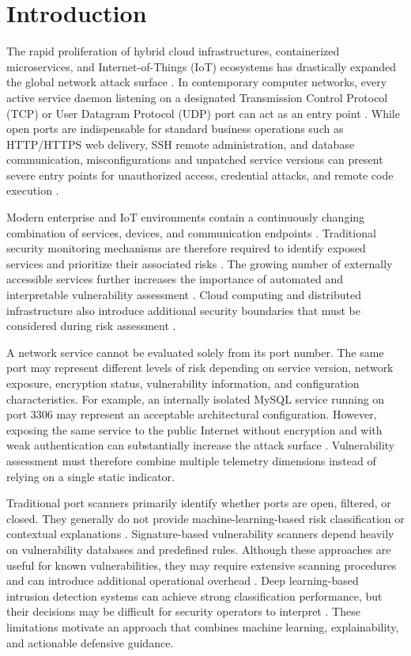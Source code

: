 \documentclass[conference]{IEEEtran}
\begin{document}
\section{Introduction}
The rapid proliferation of hybrid cloud infrastructures, containerized microservices, and Internet-of-Things (IoT) ecosystems has drastically expanded the global network attack surface \cite{conti2021survey}. In contemporary computer networks, every active service daemon listening on a designated Transmission Control Protocol (TCP) or User Datagram Protocol (UDP) port can act as an entry point \cite{lyon2009nmap}. While open ports are indispensable for standard business operations such as HTTP/HTTPS web delivery, SSH remote administration, and database communication, misconfigurations and unpatched service versions can present severe entry points for unauthorized access, credential attacks, and remote code execution \cite{pastrana2020characterizing, mell2011nist}.

Modern enterprise and IoT environments contain a continuously changing combination of services, devices, and communication endpoints \cite{conti2021survey}. Traditional security monitoring mechanisms are therefore required to identify exposed services and prioritize their associated risks \cite{lyon2009nmap}. The growing number of externally accessible services further increases the importance of automated and interpretable vulnerability assessment \cite{pastrana2020characterizing}. Cloud computing and distributed infrastructure also introduce additional security boundaries that must be considered during risk assessment \cite{mell2011nist}.

A network service cannot be evaluated solely from its port number. The same port may represent different levels of risk depending on service version, network exposure, encryption status, vulnerability information, and configuration characteristics. For example, an internally isolated MySQL service running on port 3306 may represent an acceptable architectural configuration. However, exposing the same service to the public Internet without encryption and with weak authentication can substantially increase the attack surface \cite{miller2020vulnerability, alfuqaha2015internet}. Vulnerability assessment must therefore combine multiple telemetry dimensions instead of relying on a single static indicator.

Traditional port scanners primarily identify whether ports are open, filtered, or closed. They generally do not provide machine-learning-based risk classification or contextual explanations \cite{durumeric2015search}. Signature-based vulnerability scanners depend heavily on vulnerability databases and predefined rules. Although these approaches are useful for known vulnerabilities, they may require extensive scanning procedures and can introduce additional operational overhead \cite{holm2014automated}. Deep learning-based intrusion detection systems can achieve strong classification performance, but their decisions may be difficult for security operators to interpret \cite{vinayakumar2019deep, ring2019survey}. These limitations motivate an approach that combines machine learning, explainability, and actionable defensive guidance.
\end{document}

